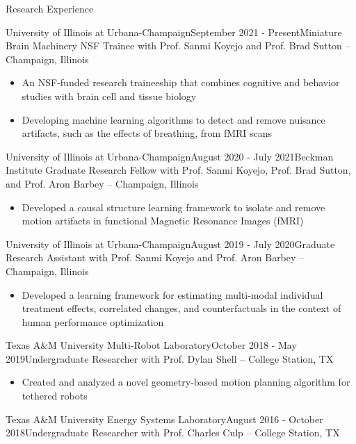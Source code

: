 \documentclass{resume} %
\begin{document}
\begin{rSection}{Research Experience}
\begin{rSubsection}{University of Illinois at Urbana-Champaign}{September 2021 - Present}{Miniature Brain Machinery NSF Trainee with Prof. Sanmi Koyejo and Prof. Brad Sutton -- Champaign, Illinois} 

\begin{itemize}
    \setlength\itemsep{0em}
    \item An NSF-funded research traineeship that combines cognitive and behavior studies with brain cell and tissue biology
    \item Developing machine learning algorithms to detect and remove nuisance artifacts, such as the effects of breathing, from fMRI scans
\end{itemize}
\end{rSubsection}
\begin{rSubsection}{University of Illinois at Urbana-Champaign}{August 2020 - July 2021}{Beckman Institute Graduate Research Fellow with Prof. Sanmi Koyejo, Prof. Brad Sutton, and Prof. Aron Barbey -- Champaign, Illinois} 

\begin{itemize}
    \setlength\itemsep{0em}
    \item Developed a causal structure learning framework to isolate and remove motion artifacts in functional Magnetic Resonance Images (fMRI)
\end{itemize}
\end{rSubsection}
\begin{rSubsection}{University of Illinois at Urbana-Champaign}{August 2019 - July 2020}{Graduate Research Assistant with Prof. Sanmi Koyejo and Prof. Aron Barbey -- Champaign, Illinois} 

\begin{itemize}
    \setlength\itemsep{0em}
    \item Developed a learning framework for estimating multi-modal individual treatment effects, correlated changes, and counterfactuals in the context of human performance optimization
\end{itemize}
\end{rSubsection}
\begin{rSubsection}{Texas A\&M University Multi-Robot Laboratory}{October 2018 - May 2019}{Undergraduate Researcher with Prof. Dylan Shell -- College Station, TX}

\begin{itemize}
    \setlength\itemsep{0em}
    \item Created and analyzed a novel geometry-based motion planning algorithm for tethered robots
\end{itemize}
\end{rSubsection}
\begin{rSubsection}{Texas A\&M University Energy Systems Laboratory}{August 2016 - October 2018}{Undergraduate Researcher with Prof. Charles Culp -- College Station, TX}


\end{rSubsection}
\end{rSection}
\end{document}

